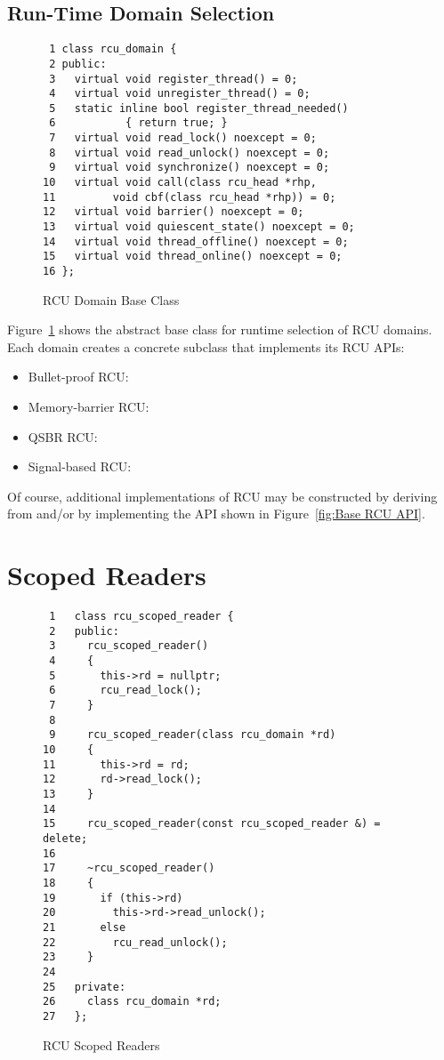\documentclass[letterpaper,twocolumn,10pt]{article}
\begin{document}
\subsection{Run-Time Domain Selection}
\label{sec:Run-Time Domain Selection}

\begin{figure}[tbp]
{ \scriptsize
\begin{verbatim}
 1 class rcu_domain {
 2 public:
 3   virtual void register_thread() = 0;
 4   virtual void unregister_thread() = 0;
 5   static inline bool register_thread_needed()
 6           { return true; }
 7   virtual void read_lock() noexcept = 0;
 8   virtual void read_unlock() noexcept = 0;
 9   virtual void synchronize() noexcept = 0;
10   virtual void call(class rcu_head *rhp,
11         void cbf(class rcu_head *rhp)) = 0;
12   virtual void barrier() noexcept = 0;
13   virtual void quiescent_state() noexcept = 0;
14   virtual void thread_offline() noexcept = 0;
15   virtual void thread_online() noexcept = 0;
16 };
\end{verbatim}
}
\caption{RCU Domain Base Class}
\label{fig:RCU Domain Base Class}
\end{figure}

Figure~\ref{fig:RCU Domain Base Class}
shows the abstract base class for runtime selection of RCU domains.
Each domain creates a concrete subclass that implements its RCU APIs:

\begin{itemize}
\item	Bullet-proof RCU: 
\item	Memory-barrier RCU: 
\item	QSBR RCU: 
\item	Signal-based RCU: 
\end{itemize}

Of course, additional implementations of RCU may be constructed by
deriving from  and/or by implementing the API
shown in
Figure~\ref{fig:Base RCU API}.

\section{Scoped Readers}
\label{sec:Scoped Readers}

\begin{figure}[tbp]
{ \scriptsize
\begin{verbatim}
 1   class rcu_scoped_reader {
 2   public:
 3     rcu_scoped_reader()
 4     {
 5       this->rd = nullptr;
 6       rcu_read_lock();
 7     }
 8
 9     rcu_scoped_reader(class rcu_domain *rd)
10     {
11       this->rd = rd;
12       rd->read_lock();
13     }
14
15     rcu_scoped_reader(const rcu_scoped_reader &) = delete;
16
17     ~rcu_scoped_reader()
18     {
19       if (this->rd)
20         this->rd->read_unlock();
21       else
22         rcu_read_unlock();
23     }
24
25   private:
26     class rcu_domain *rd;
27   };
\end{verbatim}
}
\caption{RCU Scoped Readers}
\label{fig:RCU Scoped Readers}
\end{figure}
\end{document}
